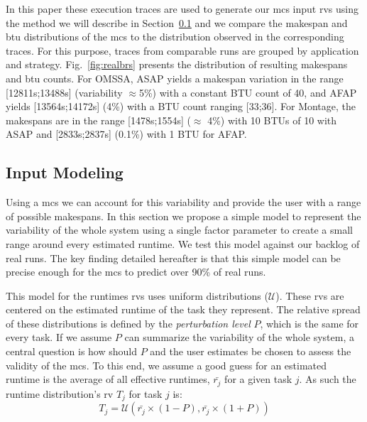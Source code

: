\documentclass[]{llncs}
\begin{document}
In this  paper these execution  traces are used  to generate our  \ac{mcs} input
\acp{rv}  using the  method  we  will describe  in  Section~\ref{sec:im} and  we
compare  the  makespan  and  \ac{btu}  distributions  of  the  \ac{mcs}  to  the
distribution observed in the corresponding traces. For this purpose, traces from
comparable    runs     are    grouped     by    application     and    strategy.
Fig.~\ref{fig:realbrs} presents  the distribution  of resulting  makespans and
\ac{btu}  counts.  For  OMSSA, ASAP  yields a  makespan variation  in the  range
[12811s;13488s] (variability $\approx$5\%) with a  constant BTU  count of 40,  and AFAP
yields [13564s;14172s] (4\%) with a BTU  count ranging [33;36]. For Montage, the
makespans are in the range [1478s;1554s] ($\approx$ 4\%) with 10 BTUs of 10 with ASAP and
[2833s;2837s] (0.1\%) with 1 BTU for AFAP.


\subsection{Input Modeling}\label{sec:im}


Using a  \ac{mcs} we can account for this  variability and provide the
user with  a range of  possible makespans. In this  section we propose  a simple
model to  represent the variability of  the whole system using a single factor
parameter to create  a small range around every estimated  runtime. We test this %
model against our backlog of real runs. The key finding detailed hereafter is
that this simple model can be precise enough for the  \ac{mcs} to predict over
90\% of real runs.

This model for the runtimes \acp{rv} uses uniform distributions ($\mathcal{U}$). 
These \acp{rv} are centered on the estimated runtime of the task they represent.
The relative spread of these distributions is defined by the \emph{perturbation
level} $P$, which is the same for every task.  If we assume $P$ can summarize
the variability of the whole system, a central question is how should $P$ and
the user estimates be chosen to assess the validity of the \ac{mcs}. To this
end, we assume a good guess for an  estimated runtime is the  average of all
effective runtimes, $\bar{r_j}$ for a given task $j$. As such the runtime
distribution's \ac{rv} $T_j$ for task $j$ is: 
\begin{equation} 
	T_j = \mathcal{U}(\bar{r_j}\times(1-P), \bar{r_j}\times(1+P))
\end{equation}
\end{document}
